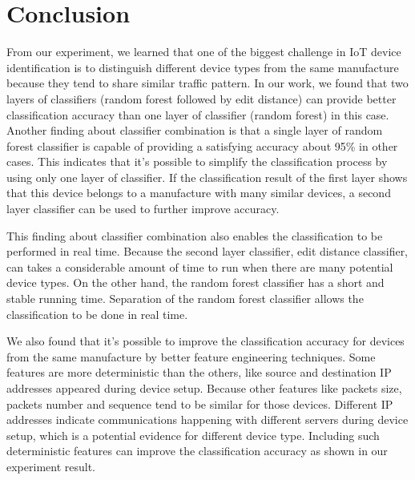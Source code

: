 \documentclass[twocolumn,10pt]{article}
\begin{document}
\section{Conclusion}

From our experiment, we learned that one of the biggest challenge in IoT device identification is to distinguish different device types from the same manufacture because they tend to share similar traffic pattern. In our work, we found that two layers of classifiers (random forest followed by edit distance) can provide better classification accuracy than one layer of classifier (random forest) in this case. Another finding about classifier combination is that a single layer of random forest classifier is capable of providing a satisfying accuracy about 95\% in other cases. This indicates that it’s possible to simplify the classification process by using only one layer of classifier. If the classification result of the first layer shows that this device belongs to a manufacture with many  similar devices, a second layer classifier can be used to further improve accuracy. 

This finding about classifier combination also enables the classification to be performed in real time. Because the second layer classifier, edit distance classifier, can takes a considerable amount of time to run when there are many potential device types. On the other hand, the random forest classifier has a short and stable running time. Separation of the random forest classifier allows the classification to be done in real time.

We also found that it’s possible to improve the classification accuracy for devices from the same manufacture by better feature engineering techniques. Some features are more deterministic than the others, like source and destination IP addresses appeared during device setup. Because other features like packets size, packets number and sequence tend to be similar for those devices. Different IP addresses indicate communications happening with different servers during device setup, which is a potential evidence for different device type. Including such deterministic features can improve the classification accuracy as shown in our experiment result.
\end{document}
